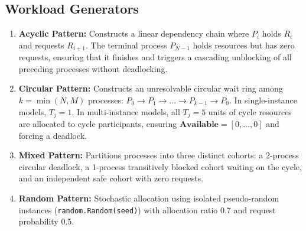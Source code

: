 \documentclass[11pt,a4paper]{article}
\begin{document}
\subsection{Workload Generators}
\begin{enumerate}
    \item \textbf{Acyclic Pattern:} Constructs a linear dependency chain where $P_i$ holds $R_i$ and requests $R_{i+1}$. The terminal process $P_{N-1}$ holds resources but has zero requests, ensuring that it finishes and triggers a cascading unblocking of all preceding processes without deadlocking.
    \item \textbf{Circular Pattern:} Constructs an unresolvable circular wait ring among $k = \min(N, M)$ processes: $P_0 \to P_1 \to \dots \to P_{k-1} \to P_0$. In single-instance models, $T_j = 1$. In multi-instance models, all $T_j = 5$ units of cycle resources are allocated to cycle participants, ensuring $\mathbf{Available} = [0, \dots, 0]$ and forcing a deadlock.
    \item \textbf{Mixed Pattern:} Partitions processes into three distinct cohorts: a 2-process circular deadlock, a 1-process transitively blocked cohort waiting on the cycle, and an independent safe cohort with zero requests.
    \item \textbf{Random Pattern:} Stochastic allocation using isolated pseudo-random instances (\texttt{random.Random(seed)}) with allocation ratio 0.7 and request probability 0.5.
\end{enumerate}

\end{document}
